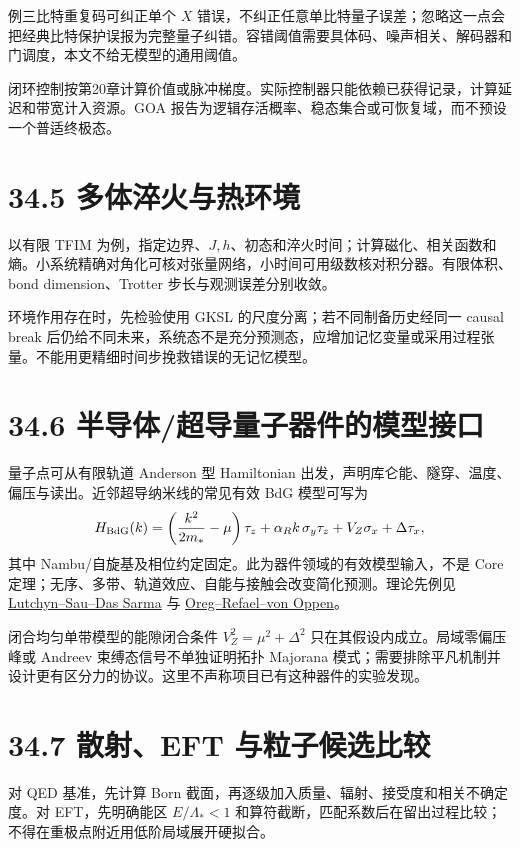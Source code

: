 \documentclass[
  11pt,
  oneside]{book}
\begin{document}
例三比特重复码可纠正单个 \(X\)
错误，不纠正任意单比特量子误差；忽略这一点会把经典比特保护误报为完整量子纠错。容错阈值需要具体码、噪声相关、解码器和门调度，本文不给无模型的通用阈值。

闭环控制按第20章计算价值或脉冲梯度。实际控制器只能依赖已获得记录，计算延迟和带宽计入资源。GOA
报告为逻辑存活概率、稳态集合或可恢复域，而不预设一个普适终极态。

\section{34.5 多体淬火与热环境}

以有限 TFIM
为例，指定边界、\(J,h\)、初态和淬火时间；计算磁化、相关函数和熵。小系统精确对角化可核对张量网络，小时间可用级数核对积分器。有限体积、bond
dimension、Trotter 步长与观测误差分别收敛。

环境作用存在时，先检验使用 GKSL 的尺度分离；若不同制备历史经同一 causal
break
后仍给不同未来，系统态不是充分预测态，应增加记忆变量或采用过程张量。不能用更精细时间步挽救错误的无记忆模型。

\section{34.6 半导体/超导量子器件的模型接口}

量子点可从有限轨道 Anderson 型 Hamiltonian
出发，声明库仑能、隧穿、温度、偏压与读出。近邻超导纳米线的常见有效 BdG
模型可写为 \[
H_{\rm BdG}(k)=
\left(\frac{k^2}{2m_*}-\mu\right)\tau_z
+\alpha_R k\,\sigma_y\tau_z+V_Z\sigma_x+\Delta\tau_x,
\] 其中 Nambu/自旋基及相位约定固定。此为器件领域的有效模型输入，不是
Core 定理；无序、多带、轨道效应、自能与接触会改变简化预测。理论先例见
\href{https://arxiv.org/abs/1002.4033}{Lutchyn--Sau--Das Sarma} 与
\href{https://arxiv.org/abs/1003.1145}{Oreg--Refael--von Oppen}。

闭合均匀单带模型的能隙闭合条件 \(V_Z^2=\mu^2+\Delta^2\)
只在其假设内成立。局域零偏压峰或 Andreev 束缚态信号不单独证明拓扑
Majorana
模式；需要排除平凡机制并设计更有区分力的协议。这里不声称项目已有这种器件的实验发现。

\section{34.7 散射、EFT 与粒子候选比较}

对 QED 基准，先计算 Born
截面，再逐级加入质量、辐射、接受度和相关不确定度。对 EFT，先明确能区
\(E/\Lambda_*<1\)
和算符截断，匹配系数后在留出过程比较；不得在重极点附近用低阶局域展开硬拟合。
\end{document}
